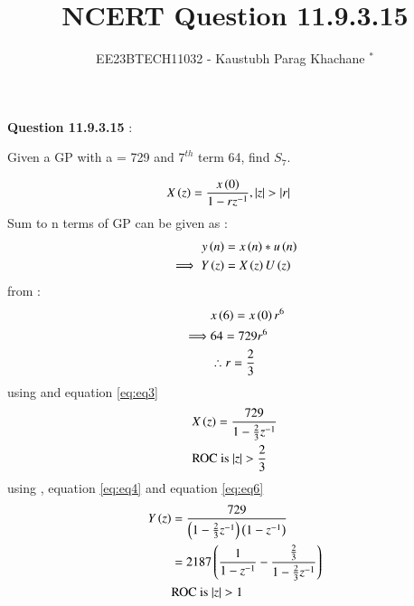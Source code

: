 \documentclass[journal,12pt,twocolumn]{IEEEtran}
\theoremstyle{remark}
\begin{document}

\vspace{3cm}

\Large\title{NCERT Question 11.9.3.15}
\large\author{EE23BTECH11032 - Kaustubh Parag Khachane $^{*}$%
}
\maketitle
\newpage
\bigskip

\renewcommand{\thefigure}{\theenumi}
\renewcommand{\thetable}{\theenumi}
\large\textbf{Question 11.9.3.15} :

Given a GP with a = 729 and $7^{th}$ term 64, find $S_7$.

\solution


\begin{align}
   & X\left(z\right) = \frac{x\left(0\right)}{1 - rz^{-1}} , \left\vert z\right\vert > \left\vert r\right\vert\label{eq:eq3}
\end{align}
 Sum to n terms of GP can be given as :
\begin{align}
    y\left(n\right) &= x\left(n\right)*u\left(n\right)\\
    \implies  Y\left(z\right) &= X\left(z\right)U\left(z\right)\label{eq:eq4}
\end{align}
from  :
\begin{align}
    &x\left(6\right) = x\left(0\right)r^6\\
    \implies &64 = 729r^6\\
    &\therefore r = \frac{2}{3}\label{eq:eq2}
\end{align}
using  and equation \eqref{eq:eq3}
\begin{align}
    &X\left(z\right) = \frac{729}{1 - \frac{2}{3}z^{-1}}\label{eq:eq6}\\
    &\text{ROC is $\left\vert z\right\vert > \frac{2}{3}$}
\end{align}
using , equation \eqref{eq:eq4} and equation \eqref{eq:eq6}
\begin{align}
    Y\left(z\right) &= \frac{729}{\left(1 - \frac{2}{3}z^{-1}\right)\left(1-z^{-1}\right)}\\
    &= 2187\left(\frac{1}{1-z^{-1}} - \frac{\frac{2}{3}}{1 - \frac{2}{3}z^{-1}}\right) \label{eq:eq5}\\
    &\text{ROC is $\left\vert z\right\vert  > 1$}
\end{align}
\end{document}
